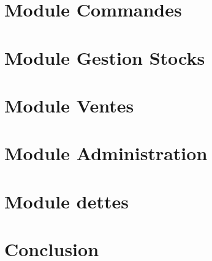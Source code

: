 \documentclass[twoside,UTF8]{EPURapport}
\begin{document}
\chapter{Module Commandes}

\chapter{Module Gestion Stocks}

\chapter{Module Ventes}

\chapter{Module Administration}

\chapter{Module dettes}

\chapter{Conclusion}

\annexes
\end{document}
